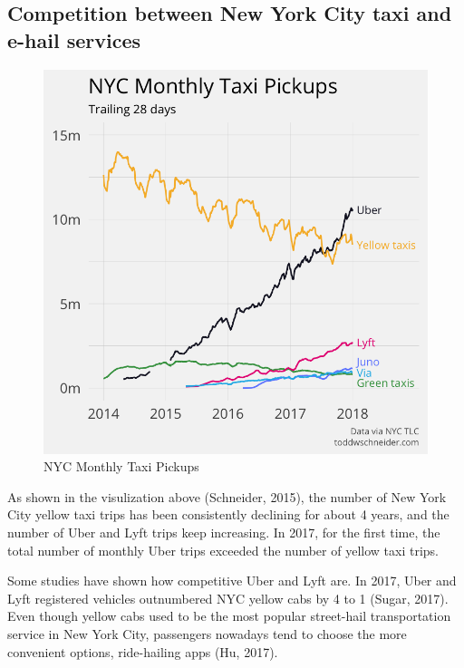 \documentclass[12pt,twoside]{reedthesis}
\theoremstyle{definition}
\theoremstyle{definition}
\theoremstyle{definition}
\theoremstyle{remark}
\begin{document}
\subsection{Competition between New York City taxi and e-hail
services}\label{competition-between-new-york-city-taxi-and-e-hail-services}
\begin{figure}[h]

{\centering \includegraphics[width=5.33in]{figure/totals_by_car_type} 

}

\caption{NYC Monthly Taxi Pickups}\label{fig:totals-by-car-type}
\end{figure}
As shown in the visulization above (Schneider, 2015), the number of New
York City yellow taxi trips has been consistently declining for about 4
years, and the number of Uber and Lyft trips keep increasing. In 2017,
for the first time, the total number of monthly Uber trips exceeded the
number of yellow taxi trips.

Some studies have shown how competitive Uber and Lyft are. In 2017, Uber
and Lyft registered vehicles outnumbered NYC yellow cabs by 4 to 1
(Sugar, 2017). Even though yellow cabs used to be the most popular
street-hail transportation service in New York City, passengers nowadays
tend to choose the more convenient options, ride-hailing apps (Hu,
2017).
\end{document}
